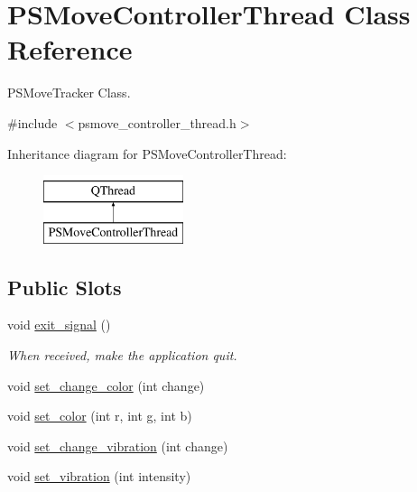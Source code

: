 \hypertarget{class_p_s_move_controller_thread}{\section{P\-S\-Move\-Controller\-Thread Class Reference}
\label{class_p_s_move_controller_thread}
}


P\-S\-Move\-Tracker Class.  




{\ttfamily \#include $<$psmove\-\_\-controller\-\_\-thread.\-h$>$}

Inheritance diagram for P\-S\-Move\-Controller\-Thread\-:\begin{figure}[H]
\begin{center}
\leavevmode
\includegraphics[height=2.000000cm]{class_p_s_move_controller_thread}
\end{center}
\end{figure}
\subsection*{Public Slots}
\begin{DoxyCompactItemize}
\item 
\hypertarget{class_p_s_move_controller_thread_a03b2e15cad0f787ecf0a29684b74df3d}{void \hyperlink{class_p_s_move_controller_thread_a03b2e15cad0f787ecf0a29684b74df3d}{exit\-\_\-signal} ()}\label{class_p_s_move_controller_thread_a03b2e15cad0f787ecf0a29684b74df3d}

\begin{DoxyCompactList}\small\item\em When received, make the application quit. \end{DoxyCompactList}\item 
void \hyperlink{class_p_s_move_controller_thread_a7d1731a0a59fbb79f8eabd3ef8693702}{set\-\_\-change\-\_\-color} (int change)
\item 
void \hyperlink{class_p_s_move_controller_thread_a213c541792eeae10dff16d6e7161152a}{set\-\_\-color} (int r, int g, int b)
\item 
void \hyperlink{class_p_s_move_controller_thread_aa06841b7432b67cad1a2e1ad4c31bbce}{set\-\_\-change\-\_\-vibration} (int change)
\item 
void \hyperlink{class_p_s_move_controller_thread_ae9cd30aaf909ed088744940de7413ebf}{set\-\_\-vibration} (int intensity)
\end{DoxyCompactItemize}
